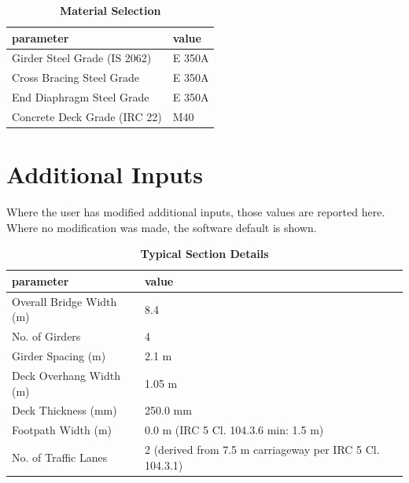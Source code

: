 \documentclass[12pt,a4paper]{report}
\numberwithin{table}{chapter}
\numberwithin{figure}{chapter}
\begin{document}
\begin{table}[H]
\caption{\textbf{Material Selection}}
\label{subsec:material}
\begin{tabular}{|L{5.5cm}|L{8.5cm}|}
\hline
\textbf{parameter} & \textbf{value} \\
\hline
\textnormal{Girder Steel Grade (IS 2062)} & E 350A \\
\hline
\textnormal{Cross Bracing Steel Grade} & E 350A \\
\hline
\textnormal{End Diaphragm Steel Grade} & E 350A \\
\hline
\textnormal{Concrete Deck Grade (IRC 22)} & M40 \\
\hline
\end{tabular}
\end{table}
\vspace{0.4cm}

\newpage
\section{Additional Inputs}
\label{sec:additional-inputs}

Where the user has modified additional inputs, those values are reported here. Where no modification was made, the software default is shown.

\vspace{0.8cm}

\begin{longtable}{|L{5.5cm}|p{10.0cm}|}
\caption{\textbf{Typical Section Details}}\\
\hline
\textbf{parameter} & \textbf{value} \\
\hline
\textnormal{Overall Bridge Width (m)} & 8.4 \\[6pt]
\hline
\textnormal{No. of Girders} & 4 \\[6pt]
\hline
\textnormal{Girder Spacing (m)} & 2.1 m \\[6pt]
\hline
\textnormal{Deck Overhang Width (m)} & 1.05 m \\[6pt]
\hline
\textnormal{Deck Thickness (mm)} & 250.0 mm \\[6pt]
\hline
\textnormal{Footpath Width (m)} & 0.0 m (IRC 5 Cl. 104.3.6 min: 1.5 m) \\[6pt]
\hline
\textnormal{No. of Traffic Lanes} & 2 (derived from 7.5 m carriageway per IRC 5 Cl. 104.3.1) \\[6pt]
\hline
\end{longtable}

\vspace{0.8em}
\end{document}
